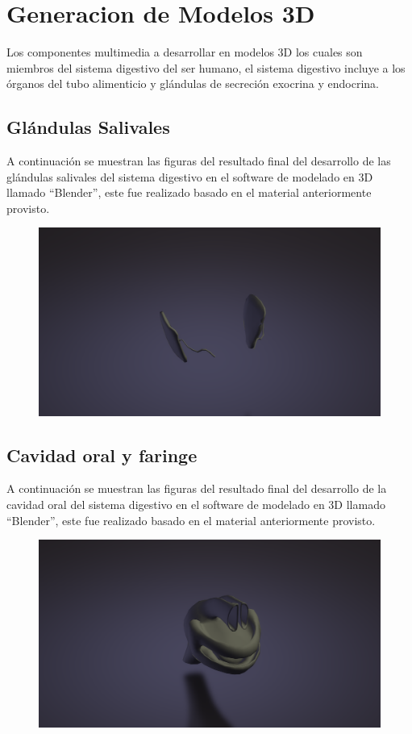 \section{Generacion de Modelos 3D}
Los componentes multimedia a desarrollar en modelos 3D los cuales son miembros del sistema digestivo del ser humano, el sistema digestivo incluye a los órganos del tubo alimenticio y glándulas de secreción exocrina y endocrina.\\

\subsection{Glándulas Salivales}
A continuación se muestran las figuras del resultado final del desarrollo de las glándulas salivales del sistema digestivo en el software de modelado en 3D llamado “Blender”, este fue realizado basado en el material anteriormente provisto.\\
\begin{figure}[H]
	\begin{center}
 		\includegraphics[width = .5\textwidth]{source/images/image41.png}
	\end{center} 
\end{figure}

\subsection{Cavidad oral y faringe}
A continuación se muestran las figuras del resultado final del desarrollo de la cavidad oral del sistema digestivo en el software de modelado en 3D llamado “Blender”, este fue realizado basado en el material anteriormente provisto.\\
\begin{figure}[H]
	\begin{center}
 		\includegraphics[width = .5\textwidth]{source/images/image14.png}
	\end{center} 
\end{figure}

